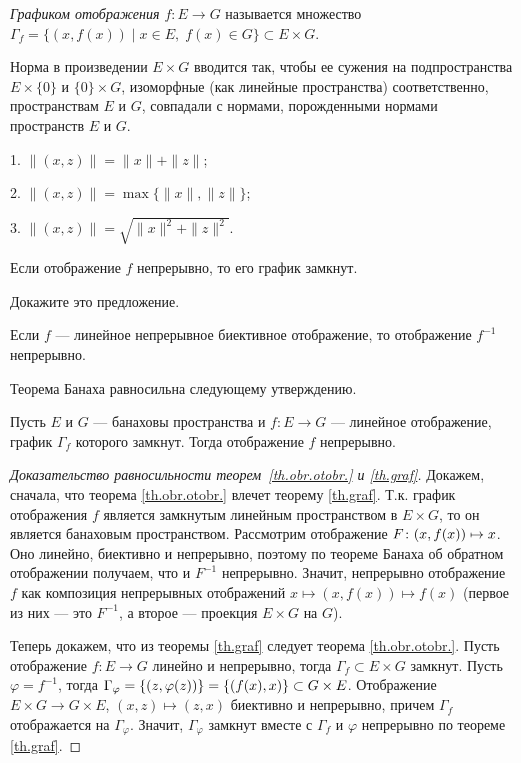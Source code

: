 \documentclass[12pt,titlepage, a4paper]{article}
\begin{document}
\begin{defen}
\emph{Графиком отображения $f\colon E\to G$} называется множество
$\Gamma_f=\{(x,f(x))\mid x\in E,\;f(x)\in G\}\subset E\times G$.
\end{defen}

Норма в произведении $E\times G$ вводится так, чтобы ее сужения на
подпространства $E\times\{0\}$ и $\{0\}\times G$, изоморфные (как
линейные пространства) соответственно, пространствам $E$ и $G$,
совпадали с нормами, порожденными нормами пространств $E$ и $G$.

\prim

1. $\|(x,z)\|=\|x\|+\|z\|$;

2. $\|(x,z)\|=\max\{\|x\|,\|z\|\}$;

3. $\|(x,z)\|=\sqrt{\|x\|^2+\|z\|^2}$.

\begin{predl}
Если отображение $f$ непрерывно, то его график замкнут.
\end{predl}

\begin{upr}
Докажите это предложение.
\end{upr}

\lecture

\begin{theorem}[Банах]\label{th.obr.otobr.}
Если $f$ --- линейное непрерывное биективное ото\-бражение, то
отображение $f^{-1}$ непрерывно.
\end{theorem}

Теорема Банаха равносильна следующему утверждению.

\begin{theorem}\label{th.graf}
Пусть $E$ и $G$ --- банаховы пространства и $f\colon E\to G$
--- линейное отображение, график $\Gamma_f$
которого замкнут. Тогда отображение $f$ непрерывно.
\end{theorem}

\begin{proof}[Доказательство равносильности теорем~\ref{th.obr.otobr.} и \ref{th.graf}]
Докажем, сначала, что теорема \ref{th.obr.otobr.} влечет теорему
\ref{th.graf}. Т.к. график отображения $f$ является замкнутым
линейным пространством в $E\times G$, то он является банаховым
пространством. Рассмотрим отображение $F\colon (x,f(x))\p\mapsto x$.
Оно линейно, биективно и непрерывно, поэтому по теореме Банаха об
обратном отображении получаем, что и $F^{-1}$ непрерывно. Значит,
непрерывно отображение $f$ как композиция непрерывных отображений
$x\mapsto (x,f(x))\mapsto f(x)$ (первое из них --- это $F^{-1}$, а
второе --- проекция $E\times G$ на $G$).

Теперь докажем, что из теоремы \ref{th.graf} следует теорема
\ref{th.obr.otobr.}. Пусть отображение $f\colon E\to G$ линейно и
непрерывно, тогда $\Gamma_f\subset E\times G$ замкнут. Пусть
$\varphi=f^{-1}$, тогда
$\Gamma_\varphi=\{(z,\varphi(z))\}\p=\{(f(x),x)\}\p\subset G\times
E$. Отображение $E\times G\to G\times E$, $(x,z)\mapsto (z,x)$
биективно и непрерывно, причем $\Gamma_f$ отображается на
$\Gamma_\varphi$. Значит, $\Gamma_\varphi$ замкнут вместе с
$\Gamma_f$ и $\varphi$ непрерывно по теореме \ref{th.graf}.
\end{proof}
\end{document}
